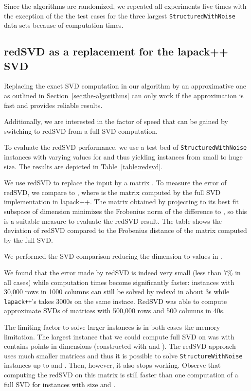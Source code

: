 \documentclass[a4paper]{scrartcl}
\begin{document}
Since the algorithms are randomized, we repeated all experiments five times with the exception of the the test cases for the three largest \texttt{StructuredWithNoise} data sets because of computation times.

\subsection{redSVD as a replacement for the lapack++ SVD}
Replacing the exact SVD computation in our algorithm by an approximative one as outlined in Section~\ref{sec:the-algorithms} can only work if the approximation is fast and provides reliable results.

Additionally, we are interested in the factor of speed that can be gained by switching to redSVD from a full SVD computation.

To evaluate the redSVD performance, we use a test bed of \texttt{StructuredWithNoise} instances with varying values for  and  thus yielding instances from small to huge size. The results are depicted in Table~\ref{table:redsvd}.

We use redSVD to replace the input  by a matrix . To measure the error of redSVD, we compare  to , where  is the matrix computed by the full SVD implementation in lapack++. The matrix obtained by projecting  to its best fit subspace of dimension  minimizes the Frobenius norm of the difference to , so this is a suitable measure to evaluate the redSVD result. The table shows the deviation of redSVD compared to the Frobenius distance of the matrix computed by the full SVD.

We performed the SVD comparison reducing the dimension to values in .

We found that the error made by redSVD is indeed very small (less than 7\% in all cases) while
computation times become significantly faster: instances with 30,000 rows in 1000 columns
can still be solved by redsvd in about 3s while \texttt{lapack++}'s takes 3000s on the same instace.
RedSVD was able to compute approximate SVDs of matrices with 500,000 rows and 500 columns in 40s.

The limiting factor to solve larger instances is in both cases the memory limitation.
The largest instance that we could compute full SVD on was with contains  points in  dimensions (constructed with  and ). The redSVD approach uses much smaller matrices and thus it is possible to solve \texttt{StructureWithNoise} instances up to  and . Then, however, it also stops working.
Observe that computing the redSVD on this  matrix is still faster than one computation of a full SVD for instances with size  and .
\end{document}
